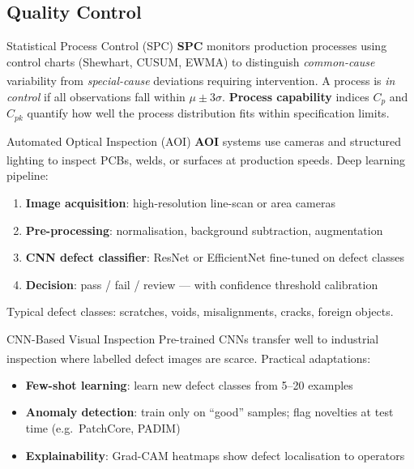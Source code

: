 \subsection{Quality Control}

\begin{v3topic}{Statistical Process Control (SPC)}
    \textbf{SPC} monitors production processes using control charts (Shewhart, CUSUM, EWMA) to distinguish \emph{common-cause} variability from \emph{special-cause} deviations requiring intervention\textsuperscript{\cite[][pp.~5--10]{leeSurveyPredictiveMaintenance2019}}.
    A process is \emph{in control} if all observations fall within $\mu \pm 3\sigma$.
    \textbf{Process capability} indices $C_p$ and $C_{pk}$ quantify how well the process distribution fits within specification limits.

\end{v3topic}
\begin{v3topic}{Automated Optical Inspection (AOI)}
    \textbf{AOI} systems use cameras and structured lighting to inspect PCBs, welds, or surfaces at production speeds\textsuperscript{\cite[][pp.~108--110]{laviollaCNNDefectDetection2019}}.
    Deep learning pipeline:
    \begin{enumerate}
        \item \textbf{Image acquisition}: high-resolution line-scan or area cameras
        \item \textbf{Pre-processing}: normalisation, background subtraction, augmentation
        \item \textbf{CNN defect classifier}: ResNet or EfficientNet fine-tuned on defect classes
        \item \textbf{Decision}: pass / fail / review — with confidence threshold calibration
    \end{enumerate}
    Typical defect classes: scratches, voids, misalignments, cracks, foreign objects.

\end{v3topic}
\begin{v3topic}{CNN-Based Visual Inspection}
    Pre-trained CNNs transfer well to industrial inspection where labelled defect images are scarce\textsuperscript{\cite[][pp.~112--115]{laviollaCNNDefectDetection2019}}.
    Practical adaptations:
    \begin{itemize}
        \item \textbf{Few-shot learning}: learn new defect classes from 5--20 examples
        \item \textbf{Anomaly detection}: train only on ``good'' samples; flag novelties at test time (e.g.\ PatchCore, PADIM)
        \item \textbf{Explainability}: Grad-CAM heatmaps show defect localisation to operators
    \end{itemize}
\end{v3topic}

